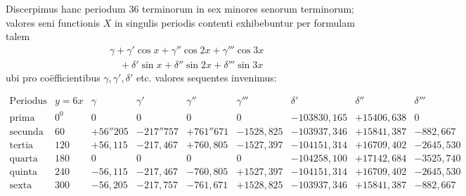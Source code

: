 Discerpimus hanc periodum \(36\) terminorum in sex minores senorum terminorum; valores seni functionis \(X\) in singulis periodis contenti exhibebuntur per formulam talem
\[
\begin{aligned}
&\gamma+\gamma'\cos x+\gamma''\cos 2x+\gamma'''\cos 3x\\[6pt]
&\quad+\delta'\sin x+\delta''\sin 2x+\delta'''\sin 3x
\end{aligned}
\]
ubi pro coëfficientibus \(\gamma,\gamma',\delta'\) etc. valores sequentes invenimus:


\begin{landscape}\thispagestyle{empty}\begingroup\fontsize{9}{12}\selectfont\setlength{\arraycolsep}{3pt}\renewcommand{\arraystretch}{1.3}
\[
\begin{array}{l|r|r|r|r|r|r|r|r}
\text{Periodus}&y=6x&\gamma&\gamma'&\gamma''&\gamma'''&\delta'&\delta''&\delta'''\\ \hline
\text{prima}&0^{\mathord{0}}&0&0&0&0&
-103830{,}165&
+15406{,}638&0\\
\text{secunda}&60&+56''205&-217''757&+761''671&-1528{,}825&-103937{,}346&+15841{,}387&-882{,}667\\
\text{tertia}&120&+56{,}115&-217{,}467&+760{,}805&-1527{,}397&-104151{,}314&+16709{,}402&-2645{,}530\\
\text{quarta}&180&0&0&0&0&-104258{,}100&+17142{,}684&-3525{,}740\\
\text{quinta}&240&-56{,}115&-217{,}467&-760{,}805&+1527{,}397&-104151{,}314&+16709{,}402&-2645{,}530\\
\text{sexta}&300&-56{,}205&-217{,}757&-761{,}671&+1528{,}825&-103937{,}346&+15841{,}387&-882{,}667
\end{array}
\]
\endgroup\end{landscape}


